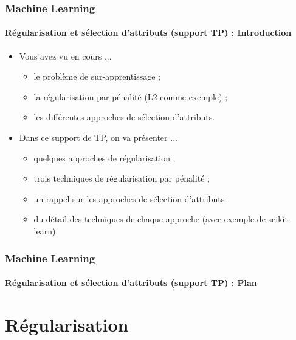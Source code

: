 \documentclass[xcolor=table]{beamer}
\subtitle[Regularization and feature selection] %
{Regularization and feature selection}
\begin{document}
	
\begin{frame}
	\frametitle{Machine Learning}
	\framesubtitle{Régularisation et sélection d'attributs  (support TP) : Introduction}
	
	\begin{itemize}
		\item Vous avez vu en cours ...
		\begin{itemize}
			\item le problème de sur-apprentissage ;
			\item la régularisation par pénalité (L2 comme exemple) ;
			\item les différentes approches de sélection d'attributs.
		\end{itemize}
		\item Dans ce support de TP, on va présenter ...
		\begin{itemize}
			\item quelques approches de régularisation ;
			\item trois techniques de régularisation par pénalité ;
			\item un rappel sur les approches de sélection d'attributs
			\item du détail des techniques de chaque approche (avec exemple de scikit-learn)
		\end{itemize}
	\end{itemize}
\end{frame}


\begin{frame}
	\frametitle{Machine Learning}
	\framesubtitle{Régularisation et sélection d'attributs (support TP) : Plan}
	
	\begin{multicols}{2}
		\tableofcontents
	\end{multicols}
\end{frame}

\section{Régularisation}
\end{document}
